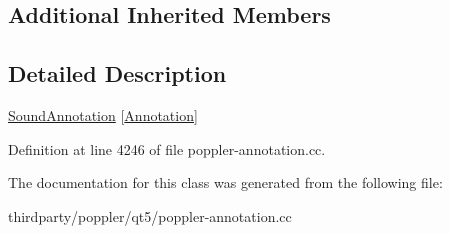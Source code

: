 \subsection*{Additional Inherited Members}


\subsection{Detailed Description}
\hyperlink{class_poppler_1_1_sound_annotation}{Sound\+Annotation} \mbox{[}\hyperlink{class_poppler_1_1_annotation}{Annotation}\mbox{]} 

Definition at line 4246 of file poppler-\/annotation.\+cc.



The documentation for this class was generated from the following file\+:\begin{DoxyCompactItemize}
\item 
thirdparty/poppler/qt5/poppler-\/annotation.\+cc\end{DoxyCompactItemize}
